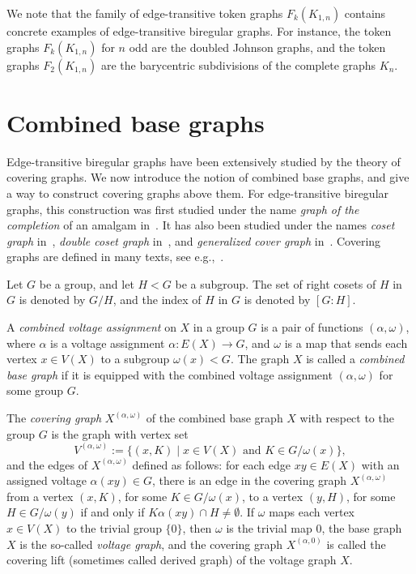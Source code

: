 \documentclass[letterpaper,10pt]{article}
\theoremstyle{plain}
\theoremstyle{definition}
\newcommand{\G}{X}
\begin{document}
We note that the family of edge-transitive token graphs  $F_k(K_{1,n})$ contains concrete examples of edge-transitive biregular graphs.
For instance, the token graphs $F_k(K_{1,n})$ for $n$ odd are the doubled Johnson graphs, and the token graphs $F_2(K_{1,n})$ are the barycentric subdivisions of the complete graphs $K_n$.

\section{Combined base graphs}
Edge-transitive biregular graphs have been extensively studied by the theory of covering graphs. 
We now introduce the notion of combined base graphs, and give a way to construct covering graphs above them. 
For edge-transitive biregular graphs, this construction was first studied under the name \emph{graph of the completion} of an amalgam in~\cite{Gold}. 
It has also been studied under the names \emph{coset graph} in~\cite{GLP},  \emph{double coset graph} in~\cite{DX}, and \emph{generalized cover graph} in~\cite{PT}. 
Covering graphs are defined in many texts, see e.g.,~\cite{biggs,AGT,GT,sunada}.

Let $G$ be a group, and let $H < G$ be a subgroup. The set of right cosets of $H$ in $G$ is denoted by $G / H$, and the index of $H$ in $G$ is denoted by $[G:H]$.

A \emph{combined voltage assignment} on $\G$ in a group $G$ is a pair of functions $(\alpha,\omega)$, where $\alpha$ is a voltage assignment $\alpha:E(\G)\to G$, and $\omega$ is a map that sends each vertex $x\in V(\G)$ to a subgroup $\omega(x)<G$. 
The graph $\G$ is called a \emph{combined base graph} if it is equipped with the combined voltage assignment $(\alpha,\omega)$ for some group $G$.

The \emph{covering graph} $\G^{(\alpha,\omega)}$ of the combined base graph $\G$ with respect to the group $G$ is the graph with vertex set
\[V^{(\alpha,\omega)}:=\{(x,K) \mid x\in V(\G) \text{ and } K\in G/\omega(x)\},\] 
and the edges of $\G^{(\alpha,\omega)}$ defined as follows: for each edge $xy\in E(\G)$ with an assigned voltage $\alpha(xy)\in G$, there is an edge in the covering graph $\G^{(\alpha,\omega)}$ from a vertex $(x,K)$, for some $K\in G/\omega(x)$, to a vertex $(y,H)$, for some $H\in G/\omega(y)$ if and only if $K\alpha(xy) \cap H\neq \emptyset$. 
If $\omega$ maps each vertex $x\in V(X)$ to the trivial group $\{0\}$, then $\omega$ is the trivial map $0$, the base graph $X$ is the so-called \emph{voltage graph}, and the covering graph $X^{(\alpha,0)}$ is called the covering lift (sometimes called derived graph) of the voltage graph $X$. 
\end{document}
